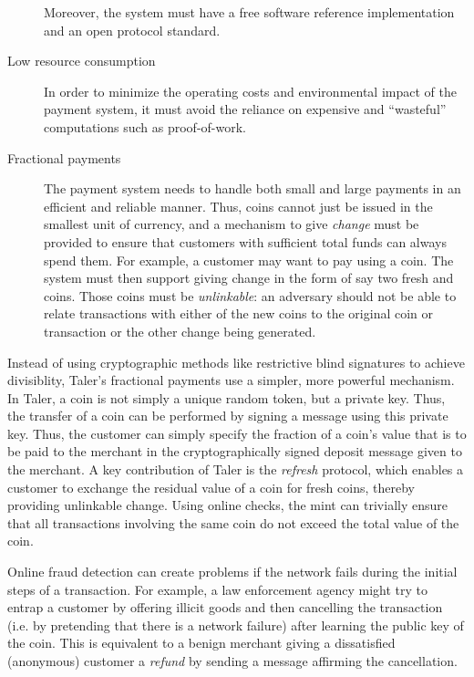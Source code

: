 \documentclass{llncs}
\begin{document}
\begin{description}
    Moreover, the system must have a free software reference
    implementation and an open protocol standard.
  \item[Low resource consumption] In order to minimize the operating
    costs and environmental impact of the payment system, it must
    avoid the reliance on expensive and ``wasteful'' computations
    such as proof-of-work.
  \item[Fractional payments] The payment system needs to handle both
    small and large payments in an efficient and reliable manner.
    Thus, coins cannot just be issued in the smallest unit of currency,
    and a mechanism to give {\em change} must be provided to ensure
    that customers with sufficient total funds can always spend them.
    For example, a customer may want to pay  using a
     coin.  The system must then support giving change in
    the form of say two fresh  and  coins.  Those
    coins must be {\em unlinkable}: an adversary should not be able to
    relate transactions with either of the new coins to the original
     coin or transaction or the other change being generated.
\end{description}

Instead of using cryptographic methods like restrictive blind
signatures to achieve divisiblity, Taler's fractional payments use a
simpler, more powerful mechanism.  In Taler, a coin is not simply a
unique random token, but a private key.  Thus, the transfer of a coin
can be performed by signing a message using this private key.  Thus,
the customer can simply specify the fraction of a coin's value that is
to be paid to the merchant in the cryptographically signed deposit
message given to the merchant.  A key contribution of Taler is the
{\em refresh} protocol, which enables a customer to exchange the
residual value of a coin for fresh coins, thereby providing unlinkable
change.  Using online checks, the mint can trivially ensure that all
transactions involving the same coin do not exceed the total value of
the coin.

Online fraud detection can create problems if the network fails during
the initial steps of a transaction.  For example, a law enforcement
agency might try to entrap a customer by offering illicit goods and
then cancelling the transaction (i.e. by pretending that there is
a network failure) after learning the public key of the
coin.  This is equivalent to a benign merchant giving a dissatisfied
(anonymous) customer a {\em refund} by sending a message affirming
the cancellation.
\end{document}
